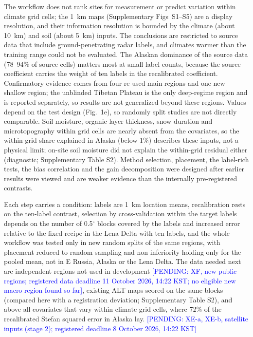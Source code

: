 The workflow does not rank sites for measurement or predict variation within climate grid cells; the 1~km maps (Supplementary Figs~S1--S5) are a display resolution, and their information resolution is bounded by the climate (about 10~km) and soil (about 5~km) inputs. The conclusions are restricted to source data that include ground-penetrating radar labels, and climates warmer than the training range could not be evaluated. The Alaskan dominance of the source data (78--94\% of source cells) matters most at small label counts, because the source coefficient carries the weight of ten labels in the recalibrated coefficient. Confirmatory evidence comes from four re-used main regions and one new shallow region; the unblinded Tibetan Plateau is the only deep-regime region and is reported separately, so results are not generalized beyond these regions. Values depend on the test design (Fig.~1e), so randomly split studies are not directly comparable. Soil moisture, organic-layer thickness, snow duration and microtopography within grid cells are nearly absent from the covariates, so the within-grid share explained in Alaska (below 1\%) describes these inputs, not a physical limit; on-site soil moisture did not explain the within-grid residual either (diagnostic; Supplementary Table S2). Method selection, placement, the label-rich tests, the bias correlation and the gain decomposition were designed after earlier results were viewed and are weaker evidence than the internally pre-registered contrasts.

Each step carries a condition: labels are 1~km location means, recalibration rests on the ten-label contrast, selection by cross-validation within the target labels depends on the number of 0.5$^{\circ}$ blocks covered by the labels and increased error relative to the fixed recipe in the Lena Delta with ten labels, and the whole workflow was tested only in new random splits of the same regions, with placement reduced to random sampling and non-inferiority holding only for the pooled mean, not in E Russia, Alaska or the Lena Delta. The data needed next are independent regions not used in development \textcolor{blue}{[PENDING: XF, new public regions; registered data deadline 11 October 2026, 14:22 KST; no eligible new macro region found so far]}, existing ALT maps scored on the same blocks~\cite{Ran2022a,Wei2026} (compared here with a registration deviation; Supplementary Table S2), and above all covariates that vary within climate grid cells, where 72\% of the recalibrated Stefan squared error in Alaska lay. \textcolor{blue}{[PENDING: XE-a, XE-b, satellite inputs (stage 2); registered deadline 8 October 2026, 14:22 KST]}

